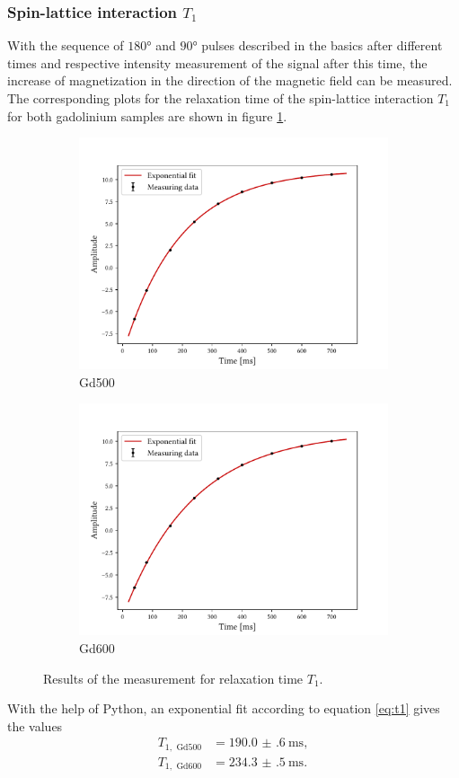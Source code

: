\subsubsection{Spin-lattice interaction $T_1$}
With the sequence of $\ang{180}$ and $\ang{90}$ pulses described in the basics after different times and respective intensity measurement of the signal after this time, the increase of magnetization in the direction of the magnetic field can be measured.\\
The corresponding plots for the relaxation time of the spin-lattice interaction $T_1$ for both gadolinium samples are shown in figure \ref{fig:t1}.
\begin{figure}[ht]
\begin{subfigure}{.45\textwidth}
\includegraphics[width=9.3cm]{..//figures//f61_abb_1.pdf}
\caption{Gd500}
\end{subfigure}
\qquad
\begin{subfigure}{.45\textwidth}
\includegraphics[width=9.3cm]{..//figures//f61_abb_1_600.pdf}
\caption{Gd600}
\end{subfigure}
\caption{Results of the measurement for relaxation time $T_1$.}
\label{fig:t1}
\end{figure}
With the help of Python, an exponential fit according to equation \ref{eq:t1} gives the values
\begin{align*}
T_{1,\text{ Gd500}}&=\SI{190.0(6)}{\milli\second},\\
T_{1,\text{ Gd600}}&=\SI{234.3(5)}{\milli\second}.
\end{align*}

